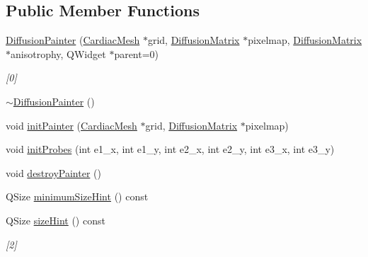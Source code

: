 \subsection*{Public Member Functions}
\begin{DoxyCompactItemize}
\item 
\hyperlink{class_diffusion_painter_a171b9c615611e9f225187f81807c00cf}{Diffusion\+Painter} (\hyperlink{class_cardiac_mesh}{Cardiac\+Mesh} $\ast$grid, \hyperlink{class_diffusion_matrix}{Diffusion\+Matrix} $\ast$pixelmap, \hyperlink{class_diffusion_matrix}{Diffusion\+Matrix} $\ast$anisotrophy, Q\+Widget $\ast$parent=0)
\begin{DoxyCompactList}\small\item\em \mbox{[}0\mbox{]} \end{DoxyCompactList}\item 
\hyperlink{class_diffusion_painter_a4e93ad45e684e622a6923bbf9871d04e}{$\sim$\+Diffusion\+Painter} ()
\item 
void \hyperlink{class_diffusion_painter_a32a09b7f3f568fff71b881ddcb729963}{init\+Painter} (\hyperlink{class_cardiac_mesh}{Cardiac\+Mesh} $\ast$grid, \hyperlink{class_diffusion_matrix}{Diffusion\+Matrix} $\ast$pixelmap)
\item 
void \hyperlink{class_diffusion_painter_a08714d5fcd525bb6a1451229e44e5cb2}{init\+Probes} (int e1\+\_\+x, int e1\+\_\+y, int e2\+\_\+x, int e2\+\_\+y, int e3\+\_\+x, int e3\+\_\+y)
\item 
void \hyperlink{class_diffusion_painter_ab71f8ba7699d9caf7927e21914c6303c}{destroy\+Painter} ()
\item 
Q\+Size \hyperlink{class_diffusion_painter_a37a27acb926fa7963fab1b8fe6763542}{minimum\+Size\+Hint} () const 
\item 
Q\+Size \hyperlink{class_diffusion_painter_a9ce48c2feffb9bcca38227cf930891ff}{size\+Hint} () const 
\begin{DoxyCompactList}\small\item\em \mbox{[}2\mbox{]} \end{DoxyCompactList}\end{DoxyCompactItemize}

